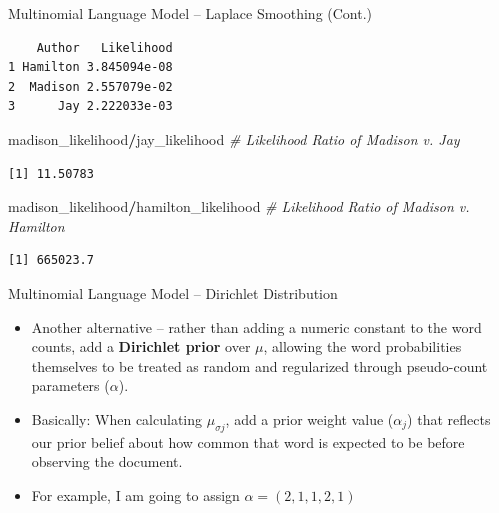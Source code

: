 \documentclass[
  ignorenonframetext,
  aspectratio=169]{beamer}
\newenvironment{Shaded}{\begin{snugshade}}{\end{snugshade}}
\newcommand{\CommentTok}[1]{\textcolor[rgb]{0.56,0.35,0.01}{\textit{#1}}}
\newcommand{\NormalTok}[1]{#1}
\newcommand{\SpecialCharTok}[1]{\textcolor[rgb]{0.81,0.36,0.00}{\textbf{#1}}}
\begin{document}
\begin{frame}[fragile]{Multinomial Language Model -- Laplace Smoothing
(Cont.)}
\begin{verbatim}
    Author   Likelihood
1 Hamilton 3.845094e-08
2  Madison 2.557079e-02
3      Jay 2.222033e-03
\end{verbatim}

\begin{Shaded}
\begin{Highlighting}[]
\NormalTok{madison\_likelihood}\SpecialCharTok{/}\NormalTok{jay\_likelihood }\CommentTok{\# Likelihood Ratio of Madison v. Jay}
\end{Highlighting}
\end{Shaded}

\begin{verbatim}
[1] 11.50783
\end{verbatim}

\begin{Shaded}
\begin{Highlighting}[]
\NormalTok{madison\_likelihood}\SpecialCharTok{/}\NormalTok{hamilton\_likelihood }\CommentTok{\# Likelihood Ratio of Madison v. Hamilton }
\end{Highlighting}
\end{Shaded}

\begin{verbatim}
[1] 665023.7
\end{verbatim}
\end{frame}

\begin{frame}{Multinomial Language Model -- Dirichlet Distribution}
\label{multinomial-language-model-dirichlet-distribution}
\begin{itemize}
\item Another alternative -- rather than adding a numeric constant to the word counts, add a \textbf{Dirichlet prior} over $\mu$, allowing the word probabilities themselves to be treated as random and regularized through pseudo-count parameters ($\alpha$). \par \vspace{2.5mm}
\item Basically: When calculating $\mu_{\sigma j}$, add a prior weight value ($\alpha_{j}$) that reflects our prior belief about how common that word is expected to be before observing the document.
\item For example, I am going to assign $\alpha = (2,1,1,2,1)$
\end{itemize}
\end{frame}
\end{document}
